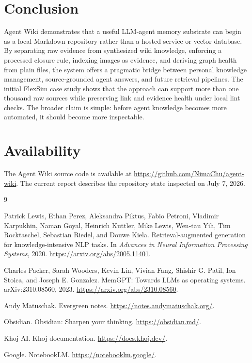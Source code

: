 \documentclass[10pt]{article}
\begin{document}
\section{Conclusion}

Agent Wiki demonstrates that a useful LLM-agent memory substrate can begin as a
local Markdown repository rather than a hosted service or vector database. By
separating raw evidence from synthesized wiki knowledge, enforcing a processed
closure rule, indexing images as evidence, and deriving graph health from plain
files, the system offers a pragmatic bridge between personal knowledge
management, source-grounded agent answers, and future retrieval pipelines. The
initial FlexSim case study shows that the approach can support more than one
thousand raw sources while preserving link and evidence health under local lint
checks. The broader claim is simple: before agent knowledge becomes more
automated, it should become more inspectable.

\section*{Availability}

The Agent Wiki source code is available at
\url{https://github.com/NimaChu/agent-wiki}. The current report describes the
repository state inspected on July 7, 2026.

\begin{thebibliography}{9}

Patrick Lewis, Ethan Perez, Aleksandra Piktus, Fabio Petroni, Vladimir
Karpukhin, Naman Goyal, Heinrich Kuttler, Mike Lewis, Wen-tau Yih, Tim
Rocktaschel, Sebastian Riedel, and Douwe Kiela.
\newblock Retrieval-augmented generation for knowledge-intensive NLP tasks.
\newblock In \emph{Advances in Neural Information Processing Systems}, 2020.
\newblock \url{https://arxiv.org/abs/2005.11401}.

Charles Packer, Sarah Wooders, Kevin Lin, Vivian Fang, Shishir G. Patil, Ion
Stoica, and Joseph E. Gonzalez.
\newblock MemGPT: Towards LLMs as operating systems.
\newblock arXiv:2310.08560, 2023.
\newblock \url{https://arxiv.org/abs/2310.08560}.

Andy Matuschak.
\newblock Evergreen notes.
\newblock \url{https://notes.andymatuschak.org/}.

Obsidian.
\newblock Obsidian: Sharpen your thinking.
\newblock \url{https://obsidian.md/}.

Khoj AI.
\newblock Khoj documentation.
\newblock \url{https://docs.khoj.dev/}.

Google.
\newblock NotebookLM.
\newblock \url{https://notebooklm.google/}.

\end{thebibliography}
\end{document}

